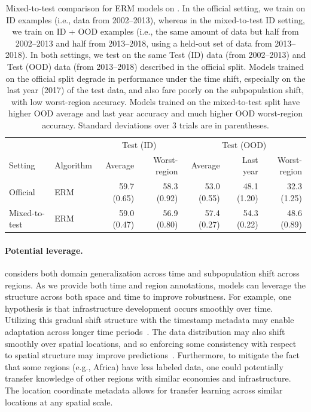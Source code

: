 \begin{table}[!h]
  \caption{Mixed-to-test comparison for ERM models on \FMoW.
  In the official setting, we train on ID examples (i.e., data from 2002--2013),
  whereas in the mixed-to-test ID setting, we train on ID + OOD examples (i.e., the same amount of data but half from 2002--2013 and half from 2013--2018, using a held-out set of data from 2013--2018).
  In both settings, we test on the same Test (ID) data (from 2002--2013) and Test (OOD) data (from 2013--2018) described in the official split.
  Models trained on the official split degrade in performance under the time shift, especially on the last year (2017) of the test data, and also fare poorly on the subpopulation shift, with low worst-region accuracy.
  Models trained on the mixed-to-test split have higher OOD average and last year accuracy and much higher OOD worst-region accuracy.
  Standard deviations over 3 trials are in parentheses.}
  \centering
  \begin{tabular} {l l r r r r r}
  \toprule
  & & \multicolumn{2}{c}{Test (ID)} & \multicolumn{3}{c}{Test (OOD)} \\
  Setting & Algorithm & Average & Worst-region & Average & Last year & Worst-region\\
  \midrule
  Official & ERM & 59.7 (0.65) & 58.3 (0.92) & 53.0 (0.55) & 48.1 (1.20) & 32.3 (1.25) \\
  Mixed-to-test & ERM & 59.0 (0.47) & 56.9 (0.80) & 57.4 (0.27) & 54.3 (0.22) & 48.6 (0.89)\\
  \bottomrule
  \end{tabular}
  \label{table:fmow-compare}
\end{table}

\paragraph{Potential leverage.}
\FMoW considers both domain generalization across time and subpopulation shift across regions. As we provide both time and region annotations, models can leverage the structure across both space and time to improve robustness.
For example, one hypothesis is that infrastructure development occurs smoothly over time. Utilizing this gradual shift structure with the timestamp metadata may enable adaptation across longer time periods~\citep{kumar2020gradual}.
The data distribution may also shift smoothly over spatial locations, and so enforcing some consistency with respect to spatial structure may improve predictions~\citep{rolf2020post,jean2018ssdkl}.
Furthermore, to mitigate the fact that some regions (e.g., Africa) have less labeled data, one could potentially transfer knowledge of other regions with similar economies and infrastructure. The location coordinate metadata allows for transfer learning across similar locations at any spatial scale.

